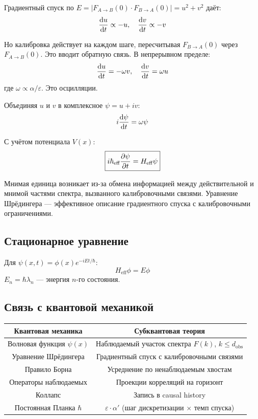 \documentclass[11pt,a4paper]{article}
\theoremstyle{definition}
\begin{document}
Градиентный спуск по $E = |F_{A \to B}(0) \cdot F_{B \to A}(0)| = u^2 + v^2$ даёт:
\begin{equation}
    \dv{u}{t} \propto -u, \quad \dv{v}{t} \propto -v
\end{equation}

Но калибровка действует на каждом шаге, пересчитывая $F_{B \to A}(0)$ через $F_{A \to B}(0)$. Это вводит обратную связь. В непрерывном пределе:
\begin{equation}
    \dv{u}{t} = -\omega v, \quad \dv{v}{t} = \omega u
\end{equation}
где $\omega \propto \alpha/\varepsilon$. Это осцилляции.

Объединяя $u$ и $v$ в комплексное $\psi = u + iv$:
\begin{equation}
    i \dv{\psi}{t} = \omega \psi
\end{equation}

С учётом потенциала $V(x)$:
\begin{equation}
    \boxed{i \hbar_{\text{eff}} \pdv{\psi}{t} = H_{\text{eff}} \psi}
\end{equation}

Мнимая единица возникает из-за обмена информацией между действительной и мнимой частями спектра, вызванного калибровочными связями. Уравнение Шрёдингера --- эффективное описание градиентного спуска с калибровочными ограничениями.

\subsection{Стационарное уравнение}

Для $\psi(x, t) = \phi(x) e^{-iEt/\hbar}$:
\begin{equation}
    H_{\text{eff}} \phi = E \phi
\end{equation}
$E_n = \hbar \lambda_n$ --- энергия $n$-го состояния.

\subsection{Связь с квантовой механикой}

\begin{center}
\begin{tabular}{c|c}
\textbf{Квантовая механика} & \textbf{Субквантовая теория} \\
\hline
Волновая функция $\psi(x)$ & Наблюдаемый участок спектра $F(k)$, $k \leq d_{\text{obs}}$ \\
Уравнение Шрёдингера & Градиентный спуск с калибровочными связями \\
Правило Борна & Усреднение по ненаблюдаемым хвостам \\
Операторы наблюдаемых & Проекции корреляций на горизонт \\
Коллапс & Запись в causal history \\
Постоянная Планка $\hbar$ & $\varepsilon \cdot \alpha'$ (шаг дискретизации $\times$ темп спуска)
\end{tabular}
\end{center}
\end{document}

